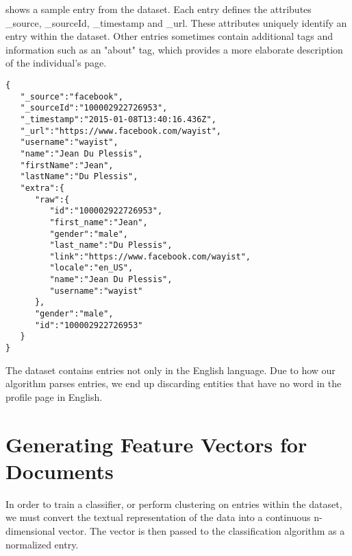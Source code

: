  shows a sample entry from the dataset.
Each entry defines the attributes \_source, \_sourceId, \_timestamp and \_url.
These attributes uniquely identify an entry within the dataset. Other entries
sometimes contain additional tags and information such as an "about" tag, which
provides a more elaborate description of the individual's page.
\lstset{language=java,caption=Dataset Entry,label=lst:dataset-entry}
\begin{lstlisting}
{
   "_source":"facebook",
   "_sourceId":"100002922726953",
   "_timestamp":"2015-01-08T13:40:16.436Z",
   "_url":"https://www.facebook.com/wayist",
   "username":"wayist",
   "name":"Jean Du Plessis",
   "firstName":"Jean",
   "lastName":"Du Plessis",
   "extra":{  
      "raw":{  
         "id":"100002922726953",
         "first_name":"Jean",
         "gender":"male",
         "last_name":"Du Plessis",
         "link":"https://www.facebook.com/wayist",
         "locale":"en_US",
         "name":"Jean Du Plessis",
         "username":"wayist"
      },
      "gender":"male",
      "id":"100002922726953"
   }
}
\end{lstlisting}

The dataset contains entries not only in the English language. Due to how
our algorithm parses entries, we end up discarding entities that have no word
in the profile page in English.

\section{Generating Feature Vectors for Documents}
\label{section:generating-features}
In order to train a classifier, or perform clustering on entries within the
dataset, we must convert the textual representation of the data into a continuous
n-dimensional vector. The vector is then passed to the classification algorithm
as a normalized entry.

